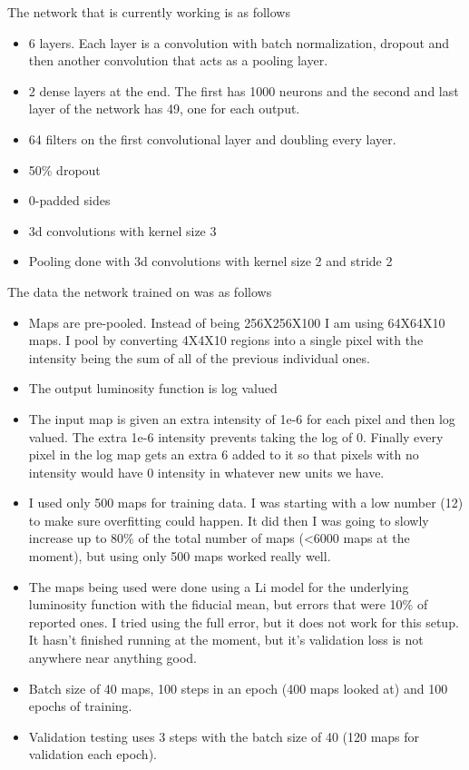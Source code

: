 \documentclass{article}
\begin{document}
		The network that is currently working is as follows
		\begin{itemize}
			\item 6 layers.  Each layer is a convolution with batch normalization, dropout and then another convolution that acts as a pooling layer.
			\item 2 dense layers at the end.  The first has 1000 neurons and the second and last layer of the network has 49, one for each output.
			\item 64 filters on the first convolutional layer and doubling every layer.
			\item 50\% dropout
			\item 0-padded sides
			\item 3d convolutions with kernel size 3
			\item Pooling done with 3d convolutions with kernel size 2 and stride 2
		\end{itemize}

		The data the network trained on was as follows
		\begin{itemize}
			\item Maps are pre-pooled.  Instead of being 256X256X100 I am using 64X64X10 maps.  I pool by converting 4X4X10 regions into a single pixel with the intensity being the sum of all of the previous individual ones.
			\item The output luminosity function is log valued
			\item The input map is given an extra intensity of 1e-6 for each pixel and then log valued.  The extra 1e-6 intensity prevents taking the log of 0.  Finally every pixel in the log map gets an extra 6 added to it so that pixels with no intensity would have 0 intensity in whatever new units we have. 
			\item I used only 500 maps for training data.  I was starting with a low number (12) to make sure overfitting could happen.  It did then I was going to slowly increase up to 80\% of the total number of maps (<6000 maps at the moment), but using only 500 maps worked really well.
			\item The maps being used were done using a Li model for the underlying luminosity function with the fiducial mean, but errors that were 10\% of reported ones.  I tried using the full error, but it does not work for this setup.  It hasn’t finished running at the moment, but it’s validation loss is not anywhere near anything good.
			\item Batch size of 40 maps, 100 steps in an epoch (400 maps looked at) and 100 epochs of training.
			\item Validation testing uses 3 steps with the batch size of 40 (120 maps for validation each epoch).
		\end{itemize}
\end{document}
